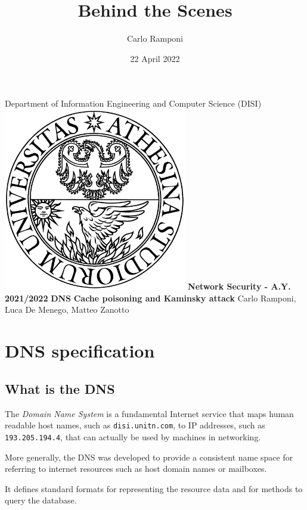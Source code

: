 \documentclass[11pt,a4paper]{article}
\title{Behind the Scenes}
\author{Carlo Ramponi}
\date{22 April 2022}
\begin{document}
\begin{titlepage}

\centering
    \vfill
    \vskip3cm
    \Large Department of Information Engineering and Computer Science
    \vskip0.5cm
    \Large (DISI)
    \vskip2cm
    \includegraphics[width=8cm]{images/logo_unitn.png}
    \vskip2cm
    \textbf{\Large Network Security - A.Y. 2021/2022}
    \vskip2cm
    \textbf{\LARGE DNS}
    \vskip0.2cm
    \textbf{\LARGE Cache poisoning and Kaminsky attack}
    \vskip4cm
    \Large Carlo Ramponi, Luca De Menego, Matteo Zanotto
    \vfill

\end{titlepage}

\clearpage

\tableofcontents

\clearpage

\section{DNS specification}

\subsection{What is the DNS}

The \emph{Domain Name System} is a fundamental Internet service that maps human readable host names, such as \texttt{disi.unitn.com}, to IP addresses, such as \texttt{193.205.194.4}, that can actually be used by machines in networking.

\noindent
More generally, the DNS was developed to provide a consistent name space for referring to internet resources such as host domain names or mailboxes.

\noindent
It defines standard formats for representing the resource data and for methods to query the database.
\end{document}
